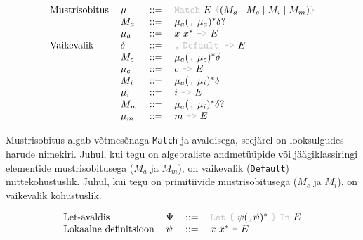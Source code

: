 \documentclass[12pt]{article}
\begin{document}
      \begin{equation*}
        \begin{tabular}{llll}
          Mustrisobitus & $\mu$    & $::=$ & {\color{helehall}\verb!Match!} $E$ {\color{helehall}\verb!{!}$(M_a\mid M_c\mid M_i\mid M_m)${\color{helehall}\verb!}!} \\
                        & $M_a$    & $::=$ & $\mu_a(${\color{helehall}\verb!,!} $\mu_a)^*\delta?$ \\
                        & $\mu_a$  & $::=$ & $x$ $x^*$ {\color{helehall}\verb!->!} $E$ \\
          Vaikevalik    & $\delta$ & $::=$ & {\color{helehall}\verb!,!} {\color{helehall}\verb!Default ->!} $E$ \\
                        & $M_c$    & $::=$ & $\mu_a(${\color{helehall}\verb!,!} $\mu_c)^*\delta$ \\
                        & $\mu_c$  & $::=$ & $c$ {\color{helehall}\verb!->!} $E$ \\
                        & $M_i$    & $::=$ & $\mu_a(${\color{helehall}\verb!,!} $\mu_i)^*\delta$ \\
                        & $\mu_i$  & $::=$ & $i$ {\color{helehall}\verb!->!} $E$ \\
                        & $M_m$    & $::=$ & $\mu_a(${\color{helehall}\verb!,!} $\mu_i)^*\delta?$ \\
                        & $\mu_m$  & $::=$ & $m$ {\color{helehall}\verb!->!} $E$
        \end{tabular}
      \end{equation*}

      Mustrisobitus algab võtmesõnaga \verb!Match! ja avaldisega, seejärel on looksulgudes harude nimekiri. Juhul, kui tegu on algebraliste andmetüüpide või jäägiklassiringi elementide mustrisobitusega ($M_a$ ja $M_m$), on vaikevalik (\verb!Default!) mittekohustuslik. Juhul, kui tegu on primitiivide mustrisobitusega ($M_c$ ja $M_i$), on vaikevalik kohustuslik.

      \begin{equation*}
        \begin{tabular}{llll}
          Let-avaldis           & $\Psi$ & $::=$ & {\color{helehall}\verb!Let!} {\color{helehall}\verb!{!} $\psi(${\color{helehall}\verb!,!}$\psi)^*$ {\color{helehall}\verb!}!} {\color{helehall}\verb!In!} $E$ \\
          Lokaalne definitsioon & $\psi$ & $::=$ & $x$ $x^*$ {\color{helehall}\verb!=!} $E$
        \end{tabular}
      \end{equation*}
\end{document}

